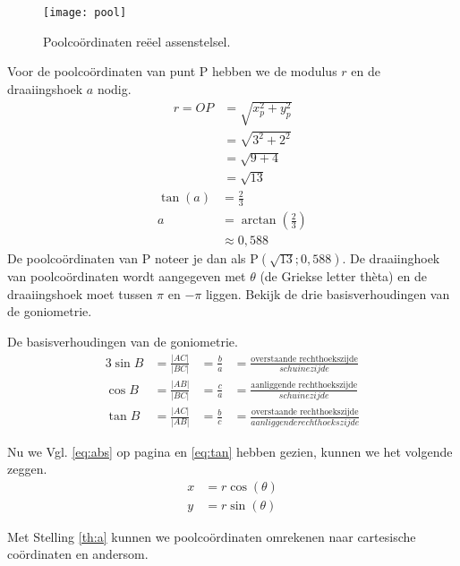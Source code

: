 \documentclass[11pt,fleqn]{book} %
\begin{document}
\begin{figure}[h]
	\centering\texttt{[image: pool]}
	\caption{Poolcoördinaten reëel assenstelsel.}
	\label{fig:pool}
\end{figure}

Voor de poolcoördinaten van punt P hebben we de modulus $r$ en de draaiingshoek $a$ nodig.
\begin{align*}
r=OP&=\sqrt{x_p^2+y_p^2}\\
&=\sqrt{3^2+2^2}\\
&=\sqrt{9+4}\\
&=\sqrt{13}
\end{align*}
\begin{align*}
\tan{(a)}&=\frac{2}{3}\\
a&=\arctan{\left(\frac{2}{3}\right)}\\
&\approx 0,588
\end{align*}
De poolcoördinaten van P noteer je dan als P$(\sqrt{13};0,588)$. De draaiinghoek van poolcoördinaten wordt aangegeven met $\theta$ (de Griekse letter thèta) en de draaiingshoek moet tussen $\pi$ en $-\pi$ liggen. Bekijk de drie basisverhoudingen van de goniometrie.
\begin{definition}
De basisverhoudingen van de goniometrie.
\\
\begin{alignat}{3}
\sin{B} &=\frac{\left|AC\right|}{\left|BC\right|} &=\frac{b}{a} &=\frac{\text{overstaande rechthoekszijde}}{schuinezijde}\\
\cos{B} &=\frac{\left|AB\right|}{\left|BC\right|} &=\frac{c}{a} &=\frac{\text{aanliggende rechthoekszijde}}{schuinezijde}\\
\tan{B} &=\frac{\left|AC\right|}{\left|AB\right|} &=\frac{b}{c} &=\frac{\text{overstaande rechthoekszijde}}{aanliggende rechthoekszijde} \label{eq:tan}
\end{alignat}
\end{definition}
\begin{theorem}\label{th:a}
Nu we Vgl. \ref{eq:abs} op pagina \pageref{eq:abs} en \ref{eq:tan} hebben gezien, kunnen we het volgende zeggen.
\begin{align*}
x &= r\cos{(\theta)}\\
y &= r\sin{(\theta)}
\end{align*}
\end{theorem}
Met Stelling \ref{th:a} kunnen we poolcoördinaten omrekenen naar cartesische coördinaten en andersom.
\end{document}
